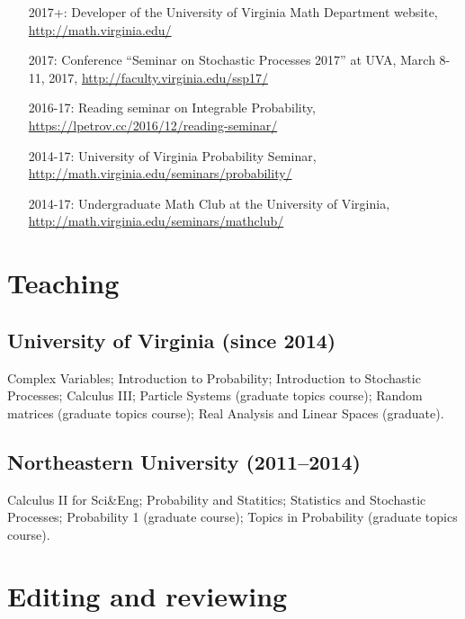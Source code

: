 \documentclass[letterpaper,11pt]{article}
\begin{document}
\begin{itemize}
	\item [2017+:]
		Developer of the University of Virginia Math Department website,
		\url{http://math.virginia.edu/}
	\item
	      [2017:] Conference
	      ``Seminar on Stochastic Processes 2017'' at UVA,
				March 8-11, 2017,
	      \url{http://faculty.virginia.edu/ssp17/}
	\item
	      [2016-17:]
				Reading seminar on Integrable Probability,
	      \url{https://lpetrov.cc/2016/12/reading-seminar/}
	\item
			[2014-17:] University of Virginia Probability Seminar,
	      \url{http://math.virginia.edu/seminars/probability/}
	\item
	      [2014-17:]
				Undergraduate Math Club at the University of Virginia,
	      \url{http://math.virginia.edu/seminars/mathclub/}
\end{itemize}

\section*{Teaching}

\subsection*{University of Virginia (since 2014)}

Complex Variables;
Introduction to Probability; 
Introduction to Stochastic Processes;
Calculus III;
Particle Systems (graduate topics course);
Random matrices (graduate topics course);
Real Analysis and Linear Spaces (graduate).

\subsection*{Northeastern University (2011--2014)}

Calculus II for Sci\&Eng;
Probability and Statitics;
Statistics and Stochastic Processes; 
Probability 1 (graduate course);
Topics in Probability (graduate topics course).

\section*{Editing and reviewing}
\end{document}
